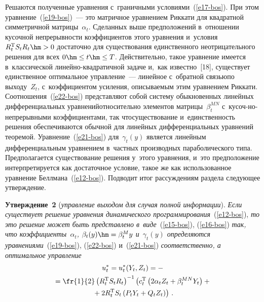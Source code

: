 \begin{multicols}{2}
     Решаются полученные уравнения с~граничными  
условиями~(\ref{e17-bos}). При этом уравнение~(\ref{e19-bos})~--- это 
матричное уравнением Риккати для квадратной симметричной 
матрицы~$\alpha_t$. Сделанных выше предположений в~отношении 
кусочной непрерывности коэффициентов этого уравнения и~условия $R_t^{\mathrm{T}} 
S_t R_t\hm>0$ достаточно для существования единственного 
неотрицательного решения для всех $0\hm\leq t\hm\leq T$. Действительно, 
такое уравнение имеется в~классической ли\-ней\-но-квад\-ра\-тич\-ной задаче 
и,~как известно~[18], существует единственное оптимальное управление~--- 
линейное с~обратной связью\linebreak по выходу~$Z_t$, с~коэффициентом усиления, 
описываемым этим урав\-не\-ни\-ем Риккати. Соотноше\-ния~(\ref{e22-bos}) 
представляют собой сис\-те\-му обыкновен\-ных линейных дифференциальных 
урав\-не\-ний\linebreak относительно элементов матрицы~$\beta_t^{MN}$  
с~ку\-соч-\linebreak но-не\-пре\-рыв\-ны\-ми коэффициентами, 
так что\linebreak существование и~единственность решения обеспечиваются обычной для линейных 
дифференциальных уравнений теоремой. Уравнение~(\ref{e21-bos}) 
для~$\gamma_t(y)$ является линейным дифференциальным уравнением 
в~частных производных параболического типа. Предполагается 
существование решения у~этого уравнения, и~это предположение 
интерпретируется как достаточное условие, такое же как использованное 
уравнение Беллмана~(\ref{e12-bos}). Подводит итог рассуждениям раздела 
следующее утверждение.
     
     \smallskip
     
     \noindent
     \textbf{Утверждение~2} (\textit{управление выходом для случая полной 
информации}). \textit{Если существует решение уравнения динамического 
программирования}~(\ref{e12-bos}), \textit{то это решение может быть 
представлено в~виде}~(\ref{e15-bos}), (\ref{e16-bos}) \textit{так, что 
коэффициенты~$\alpha_t$, $\beta_t(y)\hm= \beta_t^M y$ и~$\gamma_t(y)$ 
определяются уравнениями}~(\ref{e19-bos}), (\ref{e22-bos}) и~(\ref{e21-bos}) 
\textit{соответственно, а оптимальное управление}
     \begin{multline}
     u_t^*=u_t^*(Y_t, Z_t) =-{}\\
     {}=\fr{1}{2}\left( R_t^{\mathrm{T}} S_t R_t\right)^{-1} \left( 
c_t^{\mathrm{T}} \left( 2\alpha_t Z_t +\beta_t^{MN} Y_t\right) +{}\right.\\
\left.{}+2R_t^{\mathrm{T}} S_t\left( P_t 
Y_t+Q_t Z_t\right)\right)\,.
     \label{e23-bos}
\end{multline}


\end{multicols}
